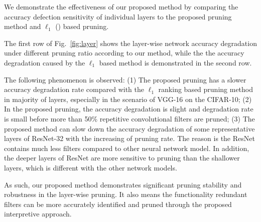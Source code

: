 \documentclass{article} %
\begin{document}
We demonstrate the effectiveness of our proposed method by comparing the accuracy defection sensitivity of individual layers to the proposed pruning method and $\ell_1$ (\cite{Li:2016:pruning}) based pruning.

The first row of Fig.~\ref{fig:layer} shows the layer-wise network accuracy degradation under different pruning ratio according to our method, while the the accuracy degradation caused by the $\ell_1$ based method is demonstrated in the second row.

The following phenomenon is observed:
(1) The proposed pruning has a slower accuracy degradation rate compared with the $\ell_1$ ranking based pruning method in majority of layers, especially in the scenario of VGG-16 on the CIFAR-10;
(2) In the proposed pruning, the accuracy degradation is slight and degradation rate is small before more than 50\% repetitive convolutional filters are pruned;
(3) The proposed method can slow down the accuracy degradation of some representative layers of ResNet-32 with the increasing of pruning rate. 
The reason is the ResNet contains much less filters compared to other neural network model.
In addition, the deeper layers of ResNet are more sensitive to pruning than the shallower layers, which is different with the other network models.


As such, our proposed method demonstrates significant pruning stability and robustness in the layer-wise pruning. 
It also means the functionality redundant filters can be more accurately identified and pruned through the proposed interpretive approach.
\end{document}
